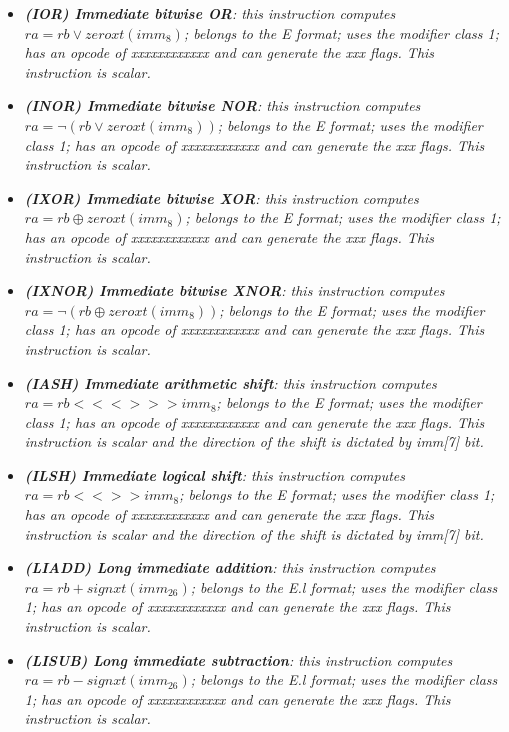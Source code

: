 \begin{multicols}{2}
\begin{itemize}
                \item \textit{\textbf{(IOR) Immediate bitwise OR}: this instruction computes \(ra = rb \vee zeroxt(imm_8)\); belongs to the E format; uses the modifier class 1; has an opcode of xxxxxxxxxxxx and can generate the xxx flags. This instruction is scalar.}

                \item \textit{\textbf{(INOR) Immediate bitwise NOR}: this instruction computes \(ra = \neg(rb \vee zeroxt(imm_8))\); belongs to the E format; uses the modifier class 1; has an opcode of xxxxxxxxxxxx and can generate the xxx flags. This instruction is scalar.}

                \item \textit{\textbf{(IXOR) Immediate bitwise XOR}: this instruction computes \(ra = rb \oplus zeroxt(imm_8)\); belongs to the E format; uses the modifier class 1; has an opcode of xxxxxxxxxxxx and can generate the xxx flags. This instruction is scalar.}

                \item \textit{\textbf{(IXNOR) Immediate bitwise XNOR}: this instruction computes \(ra = \neg(rb \oplus zeroxt(imm_8))\); belongs to the E format; uses the modifier class 1; has an opcode of xxxxxxxxxxxx and can generate the xxx flags. This instruction is scalar.}

                \item \textit{\textbf{(IASH) Immediate arithmetic shift}: this instruction computes \(ra = rb <<<>>> imm_8\); belongs to the E format; uses the modifier class 1; has an opcode of xxxxxxxxxxxx and can generate the xxx flags. This instruction is scalar and the direction of the shift is dictated by imm[7] bit.}

                \item \textit{\textbf{(ILSH) Immediate logical shift}: this instruction computes \(ra = rb <<>> imm_8\); belongs to the E format; uses the modifier class 1; has an opcode of xxxxxxxxxxxx and can generate the xxx flags. This instruction is scalar and the direction of the shift is dictated by imm[7] bit.}

                \item \textit{\textbf{(LIADD) Long immediate addition}: this instruction computes \(ra = rb + signxt(imm_{26})\); belongs to the E.l format; uses the modifier class 1; has an opcode of xxxxxxxxxxxx and can generate the xxx flags. This instruction is scalar.}

                \item \textit{\textbf{(LISUB) Long immediate subtraction}: this instruction computes \(ra = rb - signxt(imm_{26})\); belongs to the E.l format; uses the modifier class 1; has an opcode of xxxxxxxxxxxx and can generate the xxx flags. This instruction is scalar.}


\end{itemize}
\end{multicols}
